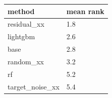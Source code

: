 \begin{tabular}{ll}
\toprule
method & mean rank \\
\midrule
residual\_xx & 1.8 \\
lightgbm & 2.6 \\
base & 2.8 \\
random\_xx & 3.2 \\
rf & 5.2 \\
target\_noise\_xx & 5.4 \\
\bottomrule
\end{tabular}
